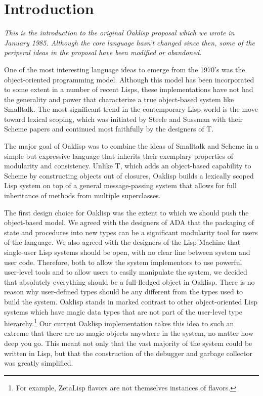 \chapter{Introduction}

\emph{This is the introduction to the original Oaklisp proposal which
we wrote in January 1985.  Although the core language hasn't changed
since then, some of the periperal ideas in the proposal have been
modified or abandoned.}

One of the most interesting language ideas to emerge from the 1970's
was the object-oriented programming model.  Although this model has
been incorporated to some extent in a number of recent Lisps, these
implementations have not had the generality and power that
characterize a true object-based system like Smalltalk.  The most
significant trend in the contemporary Lisp world is the move toward
lexical scoping, which was initiated by Steele and Sussman with their
Scheme papers and continued most faithfully by the designers of T.

The major goal of Oaklisp was to combine the ideas of Smalltalk and
Scheme in a simple but expressive language that inherits their
exemplary properties of modularity and consistency.  Unlike T, which
adds an object-based capability to Scheme by constructing objects out
of closures, Oaklisp builds a lexically scoped Lisp system on top of a
general message-passing system that allows for full inheritance of
methods from multiple superclasses.

The first design choice for Oaklisp was the extent to which we should
push the object-based model.  We agreed with the designers of ADA that
the packaging of state and procedures into new types can be a
significant modularity tool for users of the language.  We also agreed
with the designers of the Lisp Machine that single-user Lisp systems
should be open, with no clear line between system and user code.
Therefore, both to allow the system implementors to use powerful
user-level tools and to allow users to easily manipulate the system,
we decided that absolutely everything should be a full-fledged object
in Oaklisp.  There is no reason why user-defined types should be any
different from the types used to build the system.  Oaklisp stands in
marked contrast to other object-oriented Lisp systems which have magic
data types that are not part of the user-level type
hierarchy.\footnote{For example, ZetaLisp flavors are not themselves
instances of flavors.} Our current Oaklisp implementation takes this
idea to such an extreme that there are no magic objects anywhere in
the system, no matter how deep you go.  This meant not only that the
vast majority of the system could be written in Lisp, but that the
construction of the debugger and garbage collector was greatly
simplified.

